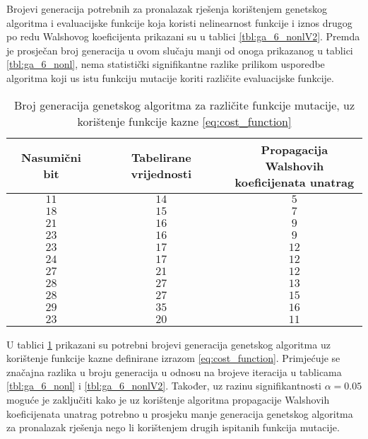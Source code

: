 Brojevi generacija potrebnih za pronalazak rješenja korištenjem genetskog algoritma i evaluacijske funkcije koja koristi nelinearnost funkcije i iznos drugog po redu Walshovog koeficijenta prikazani su u tablici \ref{tbl:ga_6_nonlV2}.
Premda je prosječan broj generacija u ovom slučaju manji od onoga prikazanog u tablici \ref{tbl:ga_6_nonl}, nema statistički signifikantne razlike prilikom usporedbe algoritma koji us istu funkciju mutacije koriti različite evaluacijske funkcije.

\begin{table}[]
    \centering
    \captionsetup{justification=centering}
    \caption{Broj generacija genetskog algoritma za različite funkcije mutacije, uz korištenje funkcije kazne \eqref{eq:cost_function}}
    \begin{tabular}{ccc} \hline
        Nasumični bit & Tabelirane vrijednosti & \makecell{Propagacija Walshovih \\ koeficijenata unatrag} \\ \hline
        $11$ & $14$ &  $5$ \\
        $18$ & $15$ &  $7$ \\
        $21$ & $16$ &  $9$ \\
        $23$ & $16$ &  $9$ \\
        $23$ & $17$ & $12$ \\
        $24$ & $17$ & $12$ \\
        $27$ & $21$ & $12$ \\
        $28$ & $27$ & $13$ \\
        $28$ & $27$ & $15$ \\
        $29$ & $35$ & $16$ \\ \hline
        $23$ & $20$ & $11$
    \end{tabular}
    \label{tbl:ga_6_walshe}
\end{table}

U tablici \ref{tbl:ga_6_walshe} prikazani su potrebni brojevi generacija genetskog algoritma uz korištenje funkcije kazne definirane izrazom \eqref{eq:cost_function}.
Primjećuje se značajna razlika u broju generacija u odnosu na brojeve iteracija u tablicama \ref{tbl:ga_6_nonl} i \ref{tbl:ga_6_nonlV2}.
Također, uz razinu signifikantnosti $\alpha = 0.05$ moguće je zaključiti kako je uz korištenje algoritma propagacije Walshovih koeficijenata unatrag potrebno u prosjeku manje generacija genetskog algoritma za pronalazak rješenja nego li korištenjem drugih ispitanih funkcija mutacije.

